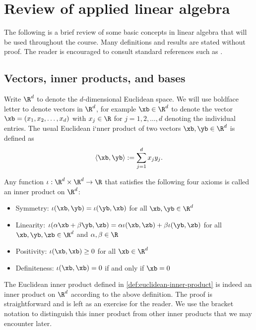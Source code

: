 \chapter{Review of applied linear algebra}

The following is a brief review of some basic concepts in linear algebra that will be used throughout the course. Many definitions and results are stated 
without proof. The reader is encouraged to consult standard references 
such as \cite{olver2006applied,boyd2018introduction,demmel1997applied,matrixcookbook}.


\section{Vectors, inner products, and bases}

Write $\R^d$ to denote the $d$-dimensional Euclidean space. 
We will use boldface letter to denote vectors in $\R^d$,
for example $\xb \in \R^d$ to denote the vector 
$\xb = (x_1, x_2, \ldots, x_d)$ with $x_j \in \R$ for $j=1,2,\ldots,d$
denoting the individual entries. The usual Euclidean i`nner product of 
two vectors $\xb, \yb \in \R^d$ is defined as
\begin{equation}\label{def:euclidean-inner-product}
\langle \xb, \yb \rangle := \sum_{j=1}^d x_j y_j.    
\end{equation}

\begin{definition}
    Any function $\iota: \R^d \times \R^d \to \R$ that satisfies 
    the following four axioms is called an inner product on $\R^d$:
    \begin{itemize}
        \item Symmetry: $\iota(\xb, \yb) = \iota(\yb, \xb)$ for all $\xb, \yb \in \R^d$
        \item Linearity: $\iota(\alpha \xb + \beta \yb, \zb) = \alpha \iota(\xb, \zb) + \beta \iota(\yb, \zb)$ for all $\xb, \yb, \zb \in \R^d$ and $\alpha, \beta \in \R$
        \item Positivity: $\iota(\xb, \xb) \ge 0$ for all $\xb \in \R^d$
        \item Definiteness: $\iota(\xb, \xb) = 0$ if and only if $\xb = 0$
    \end{itemize}
\end{definition}
The Euclidean inner product defined in  \eqref{def:euclidean-inner-product}
is indeed an inner product on $\R^d$ according to the above definition.
The proof is straightforward and is left as an exercise for the reader.
We use the bracket notation to distinguish this inner product from 
other inner products that we may encounter later.


